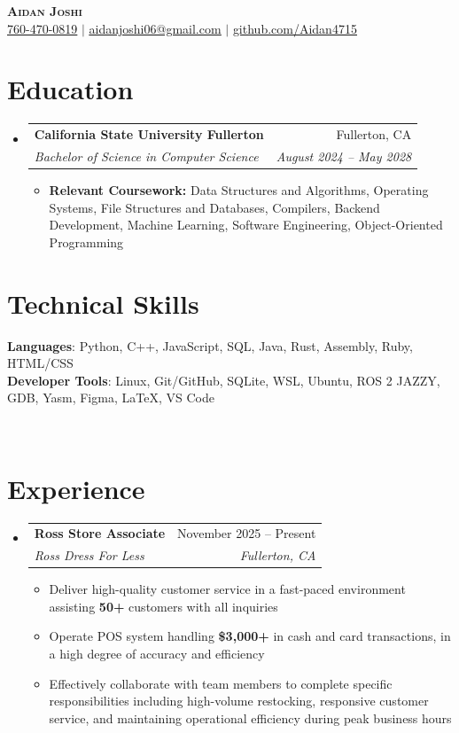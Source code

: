 \documentclass[letterpaper,11pt]{article}
\makeatletter
\newcommand{\resumeItem}[1]{
  \item\small{
    {#1 \vspace{-2pt}}
  }
}
\newcommand{\resumeSubheading}[4]{
  \vspace{-2pt}\item
    \begin{tabular*}{0.97\textwidth}[t]{l@{\extracolsep{\fill}}r}
      \textbf{#1} & #2 \\
      \textit{\small#3} & \textit{\small #4} \\
    \end{tabular*}\vspace{-7pt}
}
\newcommand{\resumeSubHeadingListStart}{\begin{itemize}[leftmargin=0.15in, label={}]}
\newcommand{\resumeSubHeadingListEnd}{\end{itemize}}
\newcommand{\resumeItemListStart}{\begin{itemize}}
\newcommand{\resumeItemListEnd}{\end{itemize}\vspace{-5pt}}
\makeatother
\begin{document}
\begin{center}
    \textbf{\Huge \scshape Aidan Joshi} \\ \vspace{1pt}
    \small \underline{760-470-0819} $|$ \href{}{\underline{aidanjoshi06@gmail.com}} $|$ 
    \href{https://github.com/Aidan4715}{\underline{github.com/Aidan4715}}
    
\end{center}



\section{Education}
  \resumeSubHeadingListStart
    \resumeSubheading
      {California State University Fullerton}{Fullerton, CA}
      {Bachelor of Science in Computer Science}{August 2024 -- May 2028}
        \resumeItemListStart
            \resumeItem{\textbf{Relevant Coursework:} Data Structures and Algorithms, Operating Systems, File Structures and Databases, Compilers, Backend Development, Machine Learning, Software Engineering, Object-Oriented Programming}
        \resumeItemListEnd

  \resumeSubHeadingListEnd



\section{Technical Skills}
 \begin{itemize}[leftmargin=0.15in, label={}]
    \small{\item{
     \textbf{Languages}{: Python, C++, JavaScript, SQL, Java, Rust, Assembly, Ruby, HTML/CSS} \\

     \textbf{Developer Tools}{: Linux, Git/GitHub, SQLite, WSL, Ubuntu, ROS 2 JAZZY, GDB, Yasm, Figma, LaTeX, VS Code} 
     }}\\

 \end{itemize}



\section{Experience}
  \resumeSubHeadingListStart
 \resumeSubheading
      {Ross Store Associate}{November 2025 -- Present}
      {Ross Dress For Less} {Fullerton, CA}
      \resumeItemListStart
        \resumeItem{Deliver high-quality customer service in a fast-paced environment assisting \textbf{50+} customers with all inquiries}
        \resumeItem{Operate POS system handling \textbf{\$3,000+} in cash and card transactions, in a high degree of accuracy and efficiency}
        \resumeItem{Effectively collaborate with team members to complete specific responsibilities including high-volume restocking, responsive customer service, and maintaining operational efficiency during peak business hours}
      \resumeItemListEnd
    \resumeSubHeadingListEnd
\end{document}
